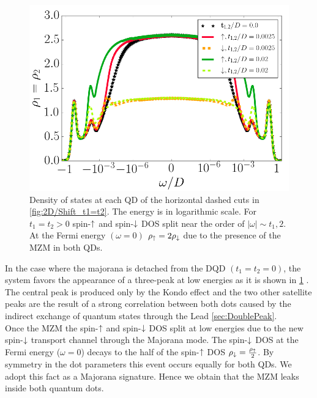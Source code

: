\begin{figure}[hbt]
\centering
\includegraphics[scale=0.35]{IMAGES/t1=t2/LogPlot.png}
\caption{\label{fig:t1=t2/logplot} Density of states at each QD of the horizontal dashed cuts in \ref{fig:2D/Shift_t1=t2}. The energy is in logarithmic scale.  For $t_1=t_2>0$ spin-$\uparrow$ and spin-$\downarrow$ DOS split near the order of $\vert \omega \vert \sim t_1,2 $. At the Fermi energy $(\omega =0)$  $\rho_\uparrow = 2\rho_\downarrow$ due to the presence of the MZM in both QDs. }
\end{figure}

In the case where the majorana is detached from the DQD $(t_1 =t_2 = 0)$, the system favors the appearance of a three-peak at low energies as it is shown in \ref{fig:t1=t2/logplot} . The central peak is produced only by the Kondo effect and the two other satellite peaks are the result of a strong correlation between both dots caused by the indirect exchange of quantum states through the Lead \ref{sec:DoublePeak}. \\

Once the MZM the spin-$\uparrow$ and spin-$\downarrow$ DOS split at low energies due to the new spin-$\downarrow$ transport channel through the Majorana mode. The spin-$\downarrow$ DOS at the Fermi energy ($\omega =0$) decays to the half of the spin-$\uparrow$ DOS $\rho_\downarrow = \frac{\rho_\uparrow}{2} $. By symmetry in the dot parameters this event occurs equally for both QDs. We adopt this fact as a Majorana signature. Hence we obtain that the MZM leaks inside both quantum dots. 

